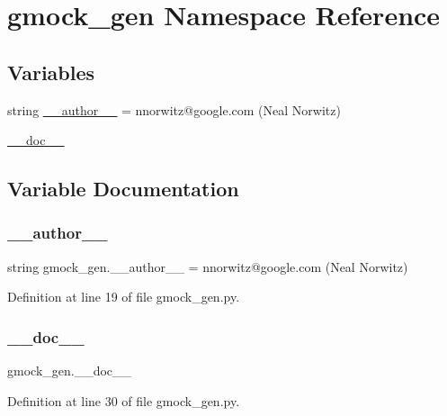 \hypertarget{namespacegmock__gen}{}\section{gmock\+\_\+gen Namespace Reference}
\label{namespacegmock__gen}
\subsection*{Variables}
\begin{DoxyCompactItemize}
\item 
string \hyperlink{namespacegmock__gen_adab615bb903ccd6be037728cbd62057b}{\+\_\+\+\_\+author\+\_\+\+\_\+} = \textquotesingle{}nnorwitz@google.\+com (Neal Norwitz)\textquotesingle{}
\item 
\hyperlink{namespacegmock__gen_af72474983cae3039ab18452d6ff6a4ed}{\+\_\+\+\_\+doc\+\_\+\+\_\+}
\end{DoxyCompactItemize}


\subsection{Variable Documentation}
\mbox{\label{namespacegmock__gen_adab615bb903ccd6be037728cbd62057b}} 
\subsubsection{\texorpdfstring{\+\_\+\+\_\+author\+\_\+\+\_\+}{\_\_author\_\_}}
{\footnotesize\ttfamily string gmock\+\_\+gen.\+\_\+\+\_\+author\+\_\+\+\_\+ = \textquotesingle{}nnorwitz@google.\+com (Neal Norwitz)\textquotesingle{}\hspace{0.3cm}{\ttfamily [private]}}



Definition at line 19 of file gmock\+\_\+gen.\+py.

\mbox{\label{namespacegmock__gen_af72474983cae3039ab18452d6ff6a4ed}} 
\subsubsection{\texorpdfstring{\+\_\+\+\_\+doc\+\_\+\+\_\+}{\_\_doc\_\_}}
{\footnotesize\ttfamily gmock\+\_\+gen.\+\_\+\+\_\+doc\+\_\+\+\_\+\hspace{0.3cm}{\ttfamily [private]}}



Definition at line 30 of file gmock\+\_\+gen.\+py.

